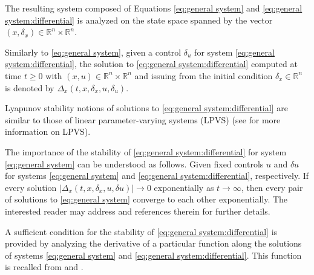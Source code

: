 \documentclass[10pt,twocolumn,twoside]{IEEEtran}
\theoremstyle{plain}
\theoremstyle{definition}
\theoremstyle{remark}
\begin{document}
The resulting system composed of Equations \eqref{eq:general system} and \eqref{eq:general system:differential} is analyzed on the state space spanned by the vector $(x,\delta_x)\in\mathbb{R}^n\times\mathbb{R}^n$. 

Similarly to \eqref{eq:general system}, given a control $\delta_u$ for system \eqref{eq:general system:differential}, the solution to \eqref{eq:general system:differential} computed at time $t\geq0$ with $(x,u)\in\mathbb{R}^n\times\mathbb{R}^n$ and issuing from the  initial condition $\delta_x\in\mathbb{R}^n$ is denoted by $\Delta_x(t,x,\delta_x,u,\delta_u)$. 

Lyapunov stability notions of solutions to \eqref{eq:general system:differential} are similar to those of linear parameter-varying systems (LPVS) (see \cite[Ch. 2 and 3]{Briat2015} for more information on LPVS). 

The importance of the stability of \eqref{eq:general system:differential} for system \eqref{eq:general system} can be understood as follows. Given fixed controls $u$ and $\delta u$ for systems \eqref{eq:general system} and \eqref{eq:general system:differential}, respectively. If every solution $|\Delta_x(t,x,\delta_x,u,\delta u)|\to0$ exponentially as $t\to\infty$, then every pair of solutions to \eqref{eq:general system} converge to each other exponentially. The interested reader may address \cite{Lohmiller1998,Sontag2010} and references therein for further details.

A sufficient condition for the stability of \eqref{eq:general system:differential} is provided by analyzing the derivative of a particular function along the solutions of systems \eqref{eq:general system} and \eqref{eq:general system:differential}. This function is recalled from \cite{Forni2014} and \cite{Manchester2014a}.
\end{document}
